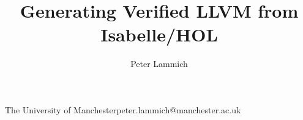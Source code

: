 \documentclass[a4paper,USenglish,cleveref, autoref]{lipics-v2019}
\begin{document}
\title{Generating Verified LLVM from Isabelle/HOL}

\author{Peter Lammich}{The University of Manchester}{peter.lammich@manchester.ac.uk}{}{}


\maketitle

\setcounter{footnote}{0}
\end{document}
